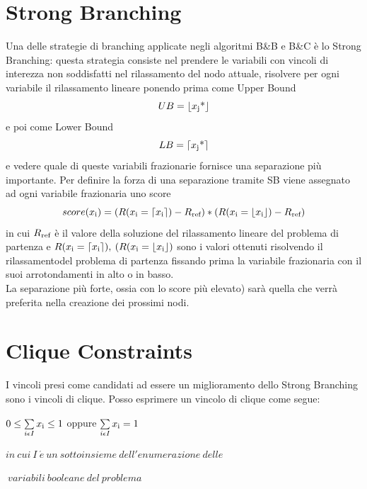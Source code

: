 \documentclass[12pt,a4paper,twoside,openright]{book}
\begin{document}
\section{Strong Branching}
Una delle strategie di branching applicate negli algoritmi B\&B e B\&C è lo Strong Branching:
questa strategia consiste nel prendere le variabili con vincoli di interezza non soddisfatti
nel rilassamento del nodo attuale, risolvere per ogni variabile il rilassamento lineare
ponendo prima come Upper Bound \[UB = \lfloor x \textsubscript{j} \textup{*} \rfloor\] e poi come Lower Bound 
\[LB = \lceil x \textsubscript{j} \textup{*} \rceil\] e vedere quale di queste variabili frazionarie
fornisce una separazione più importante. Per definire la forza di una separazione tramite SB viene assegnato
ad ogni variabile frazionaria uno score 
\[score(x\textsubscript{i}) = 
(R(x\textsubscript{i} = \lceil x\textsubscript{i} \rceil)-R\textsubscript{ref})*(R(x\textsubscript{i} = \lfloor x\textsubscript{i} \rfloor) - R\textsubscript{ref})  \]
in cui $R\textsubscript{ref}$ è il valore della soluzione del rilassamento lineare del problema di partenza
e $R(x\textsubscript{i} = \lceil x\textsubscript{i} \rceil),\:(R(x\textsubscript{i} = \lfloor x\textsubscript{i} \rfloor) $ sono i valori ottenuti risolvendo
il rilassamentodel problema di partenza fissando prima la variabile frazionaria con il suoi arrotondamenti in alto
o in basso. \\La separazione più forte, ossia con lo score più elevato) sarà quella che verrà preferita nella creazione dei prossimi nodi.
\section{Clique Constraints}
I vincoli presi come candidati ad essere un miglioramento dello Strong Branching sono i 
vincoli di clique. Posso esprimere un vincolo di clique come segue:

\begin{center}
    $ 0 \leq \sum\limits_{i \epsilon I}^{} x\textsubscript{i} \leq 1 $  oppure $ \sum\limits_{i \epsilon I}^{} x\textsubscript{i} = 1 $

    $in\:cui\:I\:\acute{e}\:un\:sottoinsieme\:dell'enumerazione\:delle$

    $\:variabili\:booleane\:del\:problema$\linebreak
\end{center}
\end{document}
